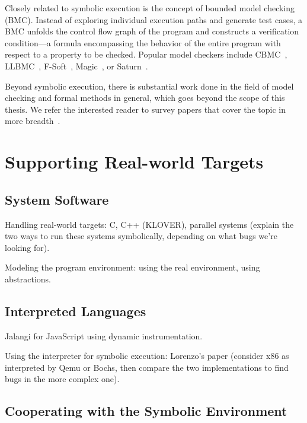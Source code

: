 Closely related to symbolic execution is the concept of bounded model checking (BMC).  Instead of exploring individual execution paths and generate test cases, a BMC unfolds the control flow graph of the program and constructs a verification condition---a formula encompassing the behavior of the entire program with respect to a property to be checked.  Popular model checkers include CBMC~\cite{cbmc}, LLBMC~\cite{llbmc2012}, F-Soft~\cite{f-soft}, Magic~\cite{magic}, or Saturn~\cite{saturn}.

Beyond symbolic execution, there is substantial work done in the field of model checking and formal methods in general, which goes beyond the scope of this thesis.  We refer the interested reader to survey papers that cover the topic in more breadth~\cite{jhala2009software, woodcock2009formal}.


\section{Supporting Real-world Targets}
\label{sec:relwork:targets}

\subsection{System Software}

Handling real-world targets: C, C++ (KLOVER), parallel systems (explain the two ways to run these systems symbolically, depending on what bugs we're looking for).

Modeling the program environment: using the real environment, using abstractions.

\subsection{Interpreted Languages}

Jalangi for JavaScript using dynamic instrumentation.

Using the interpreter for symbolic execution: Lorenzo's paper (consider x86 as interpreted by Qemu or Bochs, then compare the two implementations to find bugs in the more complex one).

\subsection{Cooperating with the Symbolic Environment}

